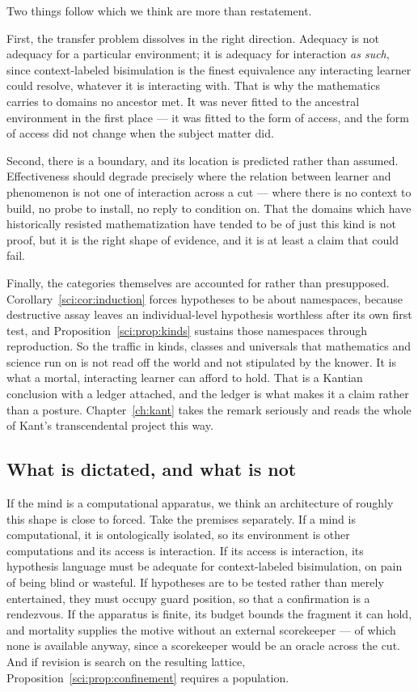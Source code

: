 Two things follow which we think are more than restatement.

First, the transfer problem dissolves in the right direction. Adequacy is not adequacy for a particular
environment; it is adequacy for interaction \emph{as such}, since context-labeled bisimulation is the
finest equivalence any interacting learner could resolve, whatever it is interacting with. That is why
the mathematics carries to domains no ancestor met. It was never fitted to the ancestral environment
in the first place --- it was fitted to the form of access, and the form of access did not change when
the subject matter did.

Second, there is a boundary, and its location is predicted rather than assumed. Effectiveness should
degrade precisely where the relation between learner and phenomenon is not one of interaction across a
cut --- where there is no context to build, no probe to install, no reply to condition on. That the
domains which have historically resisted mathematization have tended to be of just this kind is not
proof, but it is the right shape of evidence, and it is at least a claim that could fail.

Finally, the categories themselves are accounted for rather than presupposed.
Corollary~\ref{sci:cor:induction} forces hypotheses to be about namespaces, because destructive assay
leaves an individual-level hypothesis worthless after its own first test, and
Proposition~\ref{sci:prop:kinds} sustains those namespaces through reproduction. So the traffic in kinds,
classes and universals that mathematics and science run on is not read off the world and not stipulated
by the knower. It is what a mortal, interacting learner can afford to hold. That is a Kantian
conclusion with a ledger attached, and the ledger is what makes it a claim rather than a posture.
Chapter~\ref{ch:kant} takes the remark seriously and reads the whole of Kant's transcendental
project this way.

\subsection{What is dictated, and what is not}\label{sci:S17.4}

If the mind is a computational apparatus, we think an architecture of roughly this shape is close to
forced. Take the premises separately. If a mind is computational, it is ontologically isolated, so its
environment is other computations and its access is interaction. If its access is interaction, its
hypothesis language must be adequate for context-labeled bisimulation, on pain of being blind or
wasteful. If hypotheses are to be tested rather than merely entertained, they must occupy guard
position, so that a confirmation is a rendezvous. If the apparatus is finite, its budget bounds the
fragment it can hold, and mortality supplies the motive without an external scorekeeper --- of which
none is available anyway, since a scorekeeper would be an oracle across the cut. And if revision is
search on the resulting lattice, Proposition~\ref{sci:prop:confinement} requires a population.

